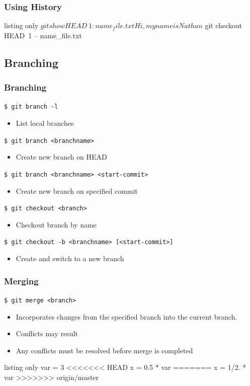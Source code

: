 \documentclass[english,compress]{beamer}
\begin{document}
\begin{frame}[fragile]
    \frametitle{Using History}
    \begin{tcblisting}{listing only}
$ git show HEAD~1:name_file.txt
Hi, my name is Nathan
$ git checkout HEAD~1 -- name_file.txt
    \end{tcblisting}
\end{frame}

\subsection{Branching}
\begin{frame}[fragile]
    \frametitle{Branching}

    \verb|$ git branch -l|
    \begin{itemize}
        \item List local branches
    \end{itemize}

    \verb|$ git branch <branchname> |
    \begin{itemize}
        \item Create new branch on HEAD
    \end{itemize}

    \verb|$ git branch <branchname> <start-commit>|
    \begin{itemize}
        \item Create new branch on specified commit
    \end{itemize}

    \verb|$ git checkout <branch>|
    \begin{itemize}
        \item Checkout branch by name
    \end{itemize}

    \verb|$ git checkout -b <branchname> [<start-commit>]|
    \begin{itemize}
        \item Create and switch to a new branch
    \end{itemize}
\end{frame}

\begin{frame}[fragile]
    \frametitle{Merging}

    \verb|$ git merge <branch>|
    \begin{itemize}
        \item Incorporates changes from the specified branch into the current
            branch.
        \item Conflicts may result
        \item Any conflicts must be resolved before merge is completed
    \end{itemize}

    \begin{tcblisting}{listing only}
var = 3
<<<<<<< HEAD
x = 0.5 * var
=======
x = 1/2. * var
>>>>>>> origin/master
    \end{tcblisting}
\end{frame}
\end{document}
